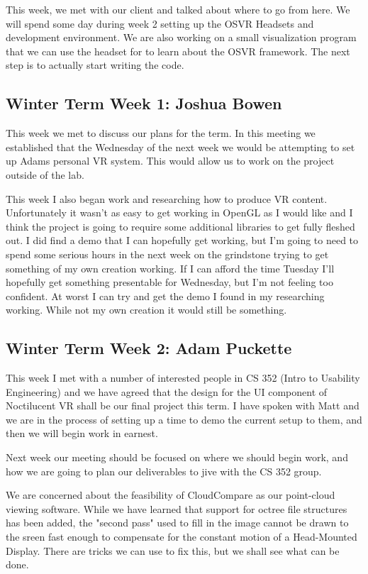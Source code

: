 \documentclass[draftclsnofoot,onecolumn]{IEEEtran}
\begin{document}
This week, we met with our client and talked about where to go from here. We will spend some day during week 2 setting up the OSVR Headsets and development environment. We are also working on a small visualization program that we can use the headset for to learn about the OSVR framework. The next step is to actually start writing the code.

\subsection{Winter Term Week 1: Joshua Bowen}

This week we met to discuss our plans for the term. In this meeting we established that the Wednesday of the next week we would be attempting to set up Adams personal VR system. This would allow us to work on the project outside of the lab.

This week I also began work and researching how to produce VR content. Unfortunately it wasn't as easy to get working in OpenGL as I would like and I think the project is going to require some additional libraries to get fully fleshed out. I did find a demo that I can hopefully get working, but I'm going to need to spend some serious hours in the next week on the grindstone trying to get something of my own creation working. If I can afford the time Tuesday I'll hopefully get something presentable for Wednesday, but I'm not feeling too confident. At worst I can try and get the demo I found in my researching working. While not my own creation it would still be something.

\subsection{Winter Term Week 2: Adam Puckette}

This week I met with a number of interested people in CS 352 (Intro to Usability Engineering) and we have agreed that the design for the UI component of Noctilucent VR shall be our final project this term. I have spoken with Matt and we are in the process of setting up a time to demo the current setup to them, and then we will begin work in earnest.

Next week our meeting should be focused on where we should begin work, and how we are going to plan our deliverables to jive with the CS 352 group.

We are concerned about the feasibility of CloudCompare as our point-cloud viewing software. While we have learned that support for octree file structures has been added, the "second pass" used to fill in the image cannot be drawn to the sreen fast enough to compensate for the constant motion of a Head-Mounted Display. There are tricks we can use to fix this, but we shall see what can be done.
\end{document}
